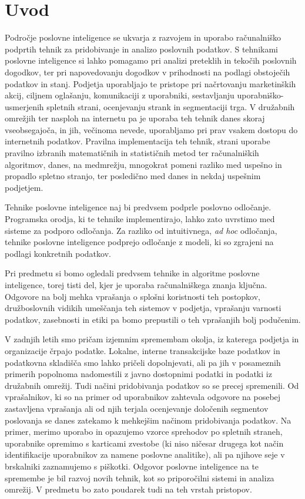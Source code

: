 \chapter{Uvod}

Področje poslovne inteligence  se
ukvarja z razvojem in uporabo računalniško podprtih tehnik za
pridobivanje in analizo poslovnih podatkov. S tehnikami poslovne
inteligence si lahko pomagamo pri analizi preteklih in tekočih
poslovnih dogodkov, ter pri napovedovanju dogodkov v prihodnosti na
podlagi obstoječih podatkov in stanj. Podjetja uporabljajo te pristope
pri načrtovanju marketinških akcij, ciljnem oglašanju, komunikaciji z
uporabniki, sestavljanju uporabniško-usmerjenih spletnih strani,
ocenjevanju strank in segmentaciji trga. V družabnih omrežjih ter
nasploh na internetu pa je uporaba teh tehnik danes skoraj
vseobsegajoča, in jih, večinoma nevede, uporabljamo pri prav vsakem
dostopu do internetnih podatkov. Pravilna implementacija teh tehnik,
strani uporabe pravilno izbranih matematičnih in statističnih metod
ter računalniških algoritmov, danes, na medmrežju, mnogokrat pomeni
razliko med uspešno in propadlo spletno stranjo, ter posledično med
danes in nekdaj uspešnim podjetjem.

Tehnike poslovne inteligence naj bi predvsem podprle poslovno
odločanje. Programska orodja, ki te tehnike implementirajo, lahko zato
uvrstimo med sisteme za podporo odločanja. Za razliko od intuitivnega,
{\em ad hoc} odločanja, tehnike poslovne inteligence podprejo
odločanje z modeli, ki so zgrajeni na podlagi konkretnih podatkov.

Pri predmetu si bomo ogledali predvsem tehnike in algoritme poslovne
inteligence, torej tisti del, kjer je uporaba računalniškega znanja
ključna. Odgovore na bolj mehka vprašanja o splošni koristnosti teh
postopkov, družboslovnih vidikih umeščanja teh sistemov v podjetja,
vprašanju varnosti podatkov, zasebnosti in etiki pa bomo prepustili o
teh vprašanjih bolj podučenim.

V zadnjih letih smo pričam izjemnim spremembam okolja, iz katerega
podjetja in organizacije črpajo podatke. Lokalne, interne
transakcijske baze podatkov in podatkovna skladišča smo lahko pričeli
dopolnjevati, ali pa jih v posameznih primerih popolnoma nadomestili z
javno dostopnimi podatki in podatki iz družabnih omrežij. Tudi načini
pridobivanja podatkov so se precej spremenili. Od vprašalnikov, ki so
na primer od uporabnikov zahtevala odgovore na posebej zastavljena
vprašanja ali od njih terjala ocenjevanje določenih segmentov
poslovanja se danes zatekamo k mehkejšim načinom pridobivanja
podatkov. Na primer, merimo uporabo in opazujemo vzorce sprehodov po
spletnih straneh, uporabnike opremimo s karticami zvestobe (ki niso
ničesar drugega kot način identifikacije uporabnikov za namene
poslovne analitike), ali pa njihove seje v brskalniki zaznamujemo s
piškotki. Odgovor poslovne inteligence na te spremembe je bil razvoj
novih tehnik, kot so priporočilni sistemi in analiza omrežij. V
predmetu bo zato poudarek tudi na teh vrstah pristopov.


